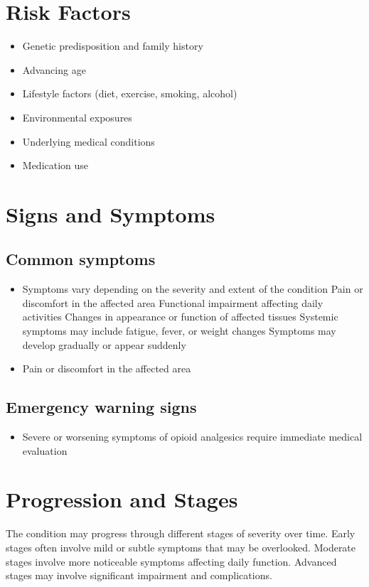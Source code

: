 \section{Risk Factors}


\begin{itemize}[noitemsep]
  \item Genetic predisposition and family history
  \item Advancing age
  \item Lifestyle factors (diet, exercise, smoking, alcohol)
  \item Environmental exposures
  \item Underlying medical conditions
  \item Medication use
\end{itemize}
\section{Signs and Symptoms}

\subsection{Common symptoms}
\begin{itemize}[noitemsep]
  \item Symptoms vary depending on the severity and extent of the condition Pain or discomfort in the affected area Functional impairment affecting daily activities Changes in appearance or function of affected tissues Systemic symptoms may include fatigue, fever, or weight changes Symptoms may develop gradually or appear suddenly
  \item Pain or discomfort in the affected area
  \end{itemize}

\subsection{Emergency warning signs}
\begin{itemize}[noitemsep]
  \item Severe or worsening symptoms of opioid analgesics require immediate medical evaluation
\end{itemize}
\section{Progression and Stages}
The condition may progress through different stages of severity over time. Early stages often involve mild or subtle symptoms that may be overlooked. Moderate stages involve more noticeable symptoms affecting daily function. Advanced stages may involve significant impairment and complications.
